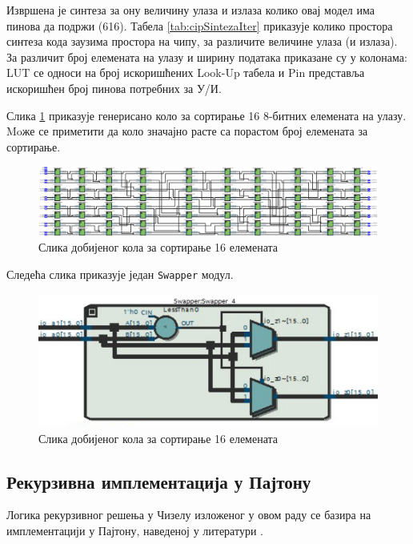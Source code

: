 \documentclass[12pt, a4paper]{article}
\theoremstyle{definition}
\begin{document}
Извршена је синтеза за ону величину улаза и излаза колико овај модел има пинова да подржи (616). Табела \ref{tab:cipSintezaIter} приказује колико простора синтеза кода заузима простора на чипу, за различите величине улаза (и излаза). За различит број елемената на улазу и ширину података приказане су у колонама: LUT се односи на број искоришћених Look-Up табела и Pin представља искоришћен број пинова потребних за У/И.

\newpage
Слика \ref{fig:RTL_Iter} приказује генерисано коло за сортирање 16 8-битних елемената на улазу. Moже се приметити да коло значајно расте са порастом број елемената за сортирање.

\begin{figure}[H]
  \centering
      \includegraphics[scale=0.24]{slike/RTL_Iter_16_8.png}
  \caption{Слика добијеног кола за сортирање 16 елемената}
  \label{fig:RTL_Iter}
\end{figure}

Следећа слика приказује један \verb+Swapper+ модул.

\begin{figure}[H]
  \centering
      \includegraphics[scale=0.5]{slike/swapper.png}
  \caption{Слика добијеног кола за сортирање 16 елемената}
  \label{fig:swapper}
\end{figure}

\newpage
\subsection{Рекурзивна имплементација у Пајтону}

Логика рекурзивног решења у Чизелу изложеног у овом раду се базира на имплементацији у Пајтону, наведеној у литератури \cite{geeks}.
\end{document}
